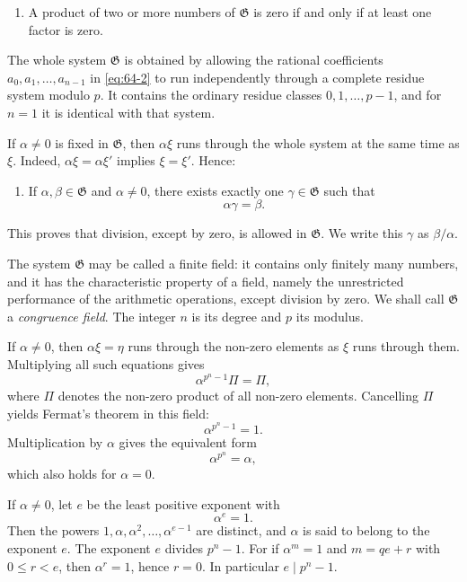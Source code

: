 \documentclass[11pt]{article}
\begin{document}
\begin{enumerate}[label=\arabic*.,resume]
\item A product of two or more numbers of \(\mathfrak G\) is zero if and only if at least one factor is zero.
\end{enumerate}
The whole system \(\mathfrak G\) is obtained by allowing the rational coefficients \(a_0,a_1,\ldots,a_{n-1}\) in \eqref{eq:64-2} to run independently through a complete residue system modulo \(p\).  It contains the ordinary residue classes \(0,1,\ldots,p-1\), and for \(n=1\) it is identical with that system.

If \(\alpha\ne0\) is fixed in \(\mathfrak G\), then \(\alpha\xi\) runs through the whole system at the same time as \(\xi\).  Indeed, \(\alpha\xi=\alpha\xi'\) implies \(\xi=\xi'\).  Hence:

\begin{enumerate}[label=\arabic*.,resume]
\item If \(\alpha,\beta\in\mathfrak G\) and \(\alpha\ne0\), there exists exactly one \(\gamma\in\mathfrak G\) such that
\[
 \alpha\gamma=\beta.
\]
\end{enumerate}
This proves that division, except by zero, is allowed in \(\mathfrak G\).  We write this \(\gamma\) as \(\beta/\alpha\).

The system \(\mathfrak G\) may be called a finite field: it contains only finitely many numbers, and it has the characteristic property of a field, namely the unrestricted performance of the arithmetic operations, except division by zero.  We shall call \(\mathfrak G\) a \emph{congruence field}.  The integer \(n\) is its degree and \(p\) its modulus.

If \(\alpha\ne0\), then \(\alpha\xi=\eta\) runs through the non-zero elements as \(\xi\) runs through them.  Multiplying all such equations gives
\[
 \alpha^{p^n-1}\Pi=\Pi,
\]
where \(\Pi\) denotes the non-zero product of all non-zero elements.  Cancelling \(\Pi\) yields Fermat's theorem in this field:
\begin{equation}\label{eq:64-3}
 \alpha^{p^n-1}=1.
\end{equation}
Multiplication by \(\alpha\) gives the equivalent form
\begin{equation}\label{eq:64-4}
 \alpha^{p^n}=\alpha,
\end{equation}
which also holds for \(\alpha=0\).

If \(\alpha\ne0\), let \(e\) be the least positive exponent with
\begin{equation}\label{eq:64-5}
 \alpha^e=1.
\end{equation}
Then the powers \(1,\alpha,\alpha^2,\ldots,\alpha^{e-1}\) are distinct, and \(\alpha\) is said to belong to the exponent \(e\).  The exponent \(e\) divides \(p^n-1\).  For if \(\alpha^m=1\) and \(m=qe+r\) with \(0\le r<e\), then \(\alpha^r=1\), hence \(r=0\).  In particular \(e\mid p^n-1\).
\end{document}
